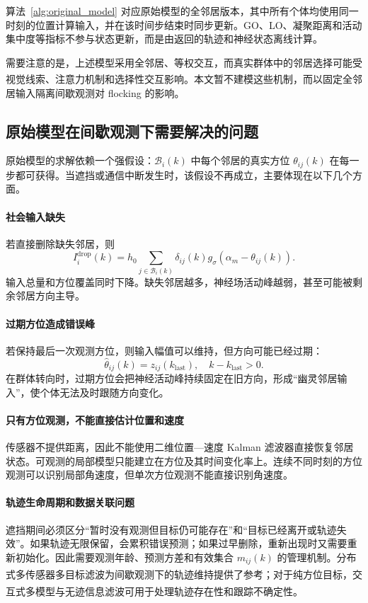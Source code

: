 \documentclass[UTF8,fontset=windows,11pt]{ctexart}
\newcommand{\upcite}[1]{\textsuperscript{\cite{#1}}}
\begin{document}
算法~\ref{alg:original_model} 对应原始模型的全邻居版本，其中所有个体均使用同一时刻的位置计算输入，并在该时间步结束时同步更新。GO、LO、凝聚距离和活动集中度等指标不参与状态更新，而是由返回的轨迹和神经状态离线计算。

需要注意的是，上述模型采用全邻居、等权交互，而真实群体中的邻居选择可能受视觉线索\upcite{Krongauz2024}、注意力机制\upcite{Li2024}和选择性交互\upcite{Xue2025}影响。本文暂不建模这些机制，而以固定全邻居输入隔离间歇观测对 flocking 的影响。

\subsection{原始模型在间歇观测下需要解决的问题}

原始模型的求解依赖一个强假设：$\mathcal B_i(k)$ 中每个邻居的真实方位 $\theta_{ij}(k)$ 在每一步都可获得。当遮挡或通信中断发生时，该假设不再成立，主要体现在以下几个方面。

\paragraph{社会输入缺失}
若直接删除缺失邻居，则
\begin{equation}
 I_i^{\mathrm{drop}}(k)=
 h_0\sum_{j\in\mathcal B_i(k)}\delta_{ij}(k)
 g_\sigma(\alpha_m-\theta_{ij}(k)).
\end{equation}
输入总量和方位覆盖同时下降。缺失邻居越多，神经场活动峰越弱，甚至可能被剩余邻居方向主导。

\paragraph{过期方位造成错误峰}
若保持最后一次观测方位，则输入幅值可以维持，但方向可能已经过期：
\begin{equation}
 \hat\theta_{ij}(k)=z_{ij}(k_{\mathrm{last}}),
\quad k-k_{\mathrm{last}}>0.
\end{equation}
在群体转向时，过期方位会把神经活动峰持续固定在旧方向，形成“幽灵邻居输入”，使个体无法及时跟随方向变化。

\paragraph{只有方位观测，不能直接估计位置和速度}
传感器不提供距离，因此不能使用二维位置—速度 Kalman 滤波器直接恢复邻居状态。可观测的局部模型只能建立在方位及其时间变化率上。连续不同时刻的方位观测可以识别局部角速度，但单次方位观测不能直接识别角速度。

\paragraph{轨迹生命周期和数据关联问题}
遮挡期间必须区分“暂时没有观测但目标仍可能存在”和“目标已经离开或轨迹失效”。如果轨迹无限保留，会累积错误预测；如果过早删除，重新出现时又需要重新初始化。因此需要观测年龄、预测方差和有效集合 $m_{ij}(k)$ 的管理机制。分布式多传感器多目标滤波为间歇观测下的轨迹维持提供了参考\upcite{Qi2024}；对于纯方位目标，交互式多模型与无迹信息滤波可用于处理轨迹存在性和跟踪不确定性\upcite{Pan2026}。
\end{document}
